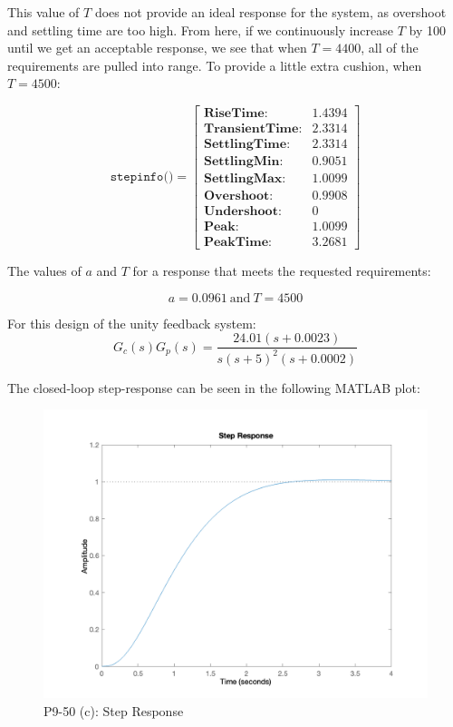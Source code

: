 \documentclass[12pt, letterpaper]{../assignment}
\begin{document}
This value of $T$ does not provide an ideal response for the system,
as overshoot and settling time are too high. From here,
if we continuously increase $T$ by 100 until we get an acceptable response,
we see that when $T = 4400$, all of the requirements are pulled into range.
To provide a little extra cushion, when $T = 4500$:

$$ \texttt{stepinfo()} =  \left[
\begin{array}{rl}
    \textbf{RiseTime:}& 1.4394\\
    \textbf{TransientTime:}& 2.3314\\
    \textbf{SettlingTime:}& 2.3314\\
    \textbf{SettlingMin:}& 0.9051\\
    \textbf{SettlingMax:}& 1.0099\\
    \textbf{Overshoot:}& 0.9908\\
    \textbf{Undershoot:}& 0\\
    \textbf{Peak:}& 1.0099\\
    \textbf{PeakTime:}& 3.2681
\end{array} \right] $$

The values of $a$ and $T$ for a response that meets the requested requirements:

\begin{answer}
    $$ a = 0.0961  \ \text{and} \ T = 4500 $$
\end{answer}


For this design of the unity feedback system:
$$ G_c(s)G_p(s) = \frac{24.01(s + 0.0023)}{s (s +5)^2(s + 0.0002)} $$

The closed-loop step-response can be seen in the following MATLAB plot:

\begin{figure}[H]
    \centering
    \includegraphics[width=1\linewidth]{./figures/step_9_50c.png}
    \caption{P9-50 (c): Step Response}
\end{figure}
\end{document}
